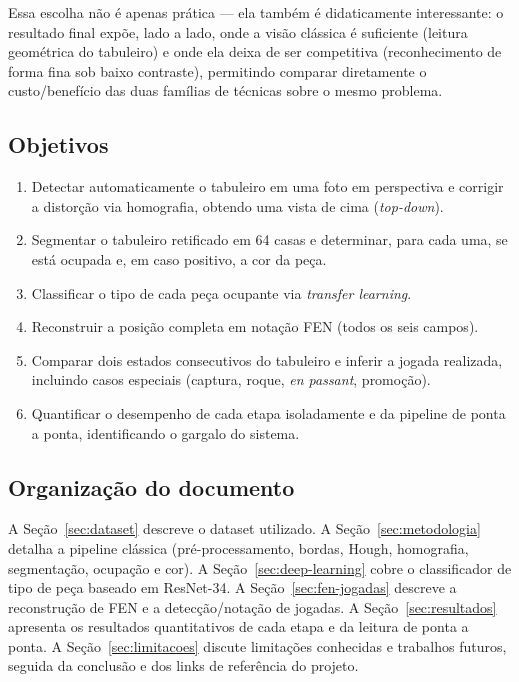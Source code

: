 Essa escolha não é apenas prática --- ela também é didaticamente interessante: o
resultado final expõe, lado a lado, onde a visão clássica é suficiente (leitura
geométrica do tabuleiro) e onde ela deixa de ser competitiva (reconhecimento de forma
fina sob baixo contraste), permitindo comparar diretamente o custo/benefício das duas
famílias de técnicas sobre o mesmo problema.

\subsection{Objetivos}

\begin{enumerate}[nosep]
  \item Detectar automaticamente o tabuleiro em uma foto em perspectiva e corrigir a
        distorção via homografia, obtendo uma vista de cima (\textit{top-down}).
  \item Segmentar o tabuleiro retificado em 64 casas e determinar, para cada uma, se
        está ocupada e, em caso positivo, a cor da peça.
  \item Classificar o tipo de cada peça ocupante via \textit{transfer learning}.
  \item Reconstruir a posição completa em notação FEN (todos os seis campos).
  \item Comparar dois estados consecutivos do tabuleiro e inferir a jogada realizada,
        incluindo casos especiais (captura, roque, \textit{en passant}, promoção).
  \item Quantificar o desempenho de cada etapa isoladamente e da pipeline de ponta a
        ponta, identificando o gargalo do sistema.
\end{enumerate}

\subsection{Organização do documento}

A Seção~\ref{sec:dataset} descreve o dataset utilizado. A
Seção~\ref{sec:metodologia} detalha a pipeline clássica (pré-processamento, bordas,
Hough, homografia, segmentação, ocupação e cor). A Seção~\ref{sec:deep-learning} cobre o
classificador de tipo de peça baseado em ResNet-34. A Seção~\ref{sec:fen-jogadas}
descreve a reconstrução de FEN e a detecção/notação de jogadas. A
Seção~\ref{sec:resultados} apresenta os resultados quantitativos de cada etapa e da
leitura de ponta a ponta. A Seção~\ref{sec:limitacoes} discute limitações conhecidas e
trabalhos futuros, seguida da conclusão e dos links de referência do projeto.
